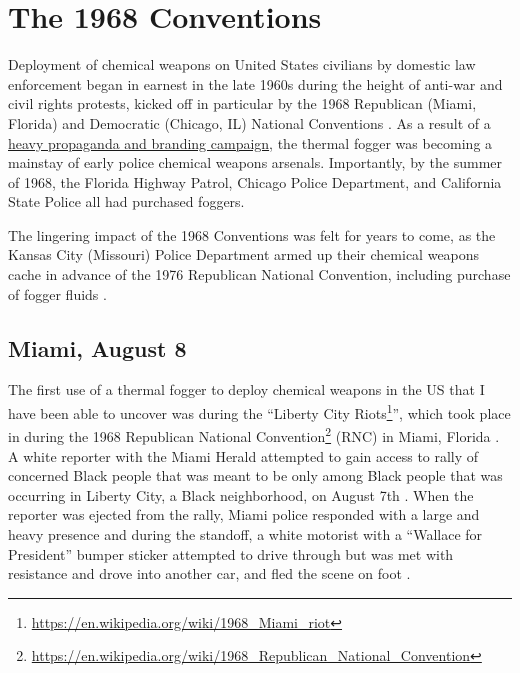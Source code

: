 \documentclass[
  11pt,
]{krantz}
\renewcommand{\href}[2]{#2\footnote{\url{#1}}}
\begin{document}
\hypertarget{The1968Conventions}{%
\chapter*{The 1968 Conventions}\label{The1968Conventions}}


Deployment of chemical weapons on United States civilians by domestic law enforcement began in earnest in the late 1960s during the height of anti-war and civil rights protests, kicked off in particular by the 1968 Republican (Miami, Florida) and Democratic (Chicago, IL) National Conventions \citep{McArdle2018, TaylorandMorris2018}.
As a result of a \protect\hyperlink{TheReturn}{heavy propaganda and branding campaign}, the thermal fogger was becoming a mainstay of early police chemical weapons arsenals.
Importantly, by the summer of 1968, the Florida Highway Patrol, Chicago Police Department, and California State Police all had purchased foggers.

The lingering impact of the 1968 Conventions was felt for years to come, as the Kansas City (Missouri) Police Department armed up their chemical weapons cache in advance of the 1976 Republican National Convention, including purchase of fogger fluids \citep{Hudson1976}.

\hypertarget{MiamiFL1968_08_08}{%
\section*{Miami, August 8}\label{MiamiFL1968_08_08}}


The first use of a thermal fogger to deploy chemical weapons in the US that I have been able to uncover was during the ``\href{https://en.wikipedia.org/wiki/1968_Miami_riot}{Liberty City Riots}'', which took place in during the \href{https://en.wikipedia.org/wiki/1968_Republican_National_Convention}{1968 Republican National Convention} (RNC) in Miami, Florida \citep{Tschenschlok1995, Tschenschlok1996, McArdle2018}.
A white reporter with the Miami Herald attempted to gain access to rally of concerned Black people that was meant to be only among Black people that was occurring in Liberty City, a Black neighborhood, on August 7th \citep{Tschenschlok1995, Tschenschlok1996}.
When the reporter was ejected from the rally, Miami police responded with a large and heavy presence and during the standoff, a white motorist with a ``Wallace for President'' bumper sticker attempted to drive through but was met with resistance and drove into another car, and fled the scene on foot \citep{Tschenschlok1995, Lorentzen2018}.
\end{document}
